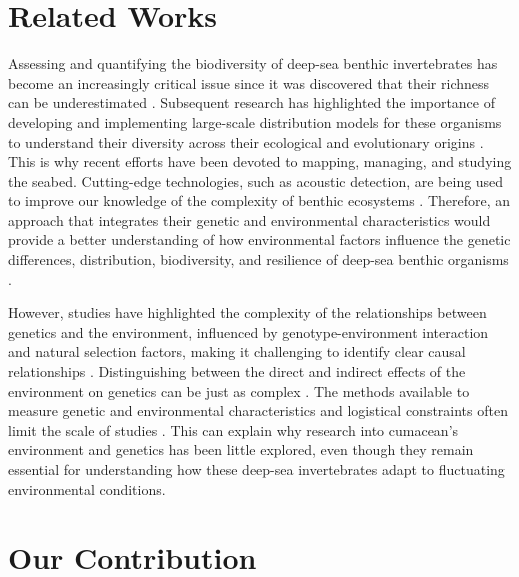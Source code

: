 \section{Related Works}\label{related-works}
Assessing and quantifying the biodiversity of deep-sea benthic invertebrates has become an increasingly critical issue since it was discovered that their richness can be underestimated \citep{grassle1992deep}. Subsequent research has highlighted the importance of developing and implementing large-scale distribution models for these organisms to understand their diversity across their ecological and evolutionary origins \citep{rex1997large}. This is why recent efforts have been devoted to mapping, managing, and studying the seabed. Cutting-edge technologies, such as acoustic detection, are being used to improve our knowledge of the complexity of benthic ecosystems \citep{brown2011benthic}. Therefore, an approach that integrates their genetic and environmental characteristics would provide a better understanding of how environmental factors influence the genetic differences, distribution, biodiversity, and resilience of deep-sea benthic organisms \citep{etter1990population, vrijenhoek2009cryptic}.

However, studies have highlighted the complexity of the relationships between genetics and the environment, influenced by genotype-environment interaction and natural selection factors, making it challenging to identify clear causal relationships \citep{balkenhol_identifying_2009}. Distinguishing between the direct and indirect effects of the environment on genetics can be just as complex \citep{manel_perspectives_2010, balkenhol_landscape_2019}. The methods available to measure genetic and environmental characteristics and logistical constraints often limit the scale of studies \citep{manel_perspectives_2010, shafer_widespread_2013}. This can explain why research into cumacean’s environment and genetics has been little explored, even though they remain essential for understanding how these deep-sea invertebrates adapt to fluctuating environmental conditions.


\section{Our Contribution}

